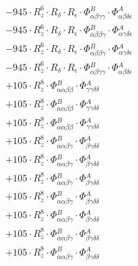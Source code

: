 \documentclass{article}
\begin{document}
\begin{subequations}
\begin{gather}
\begin{array}{c}
 \\[0.2em] 		 - 945 \cdot R_{z}^{6} \cdot R_{\delta{}} \cdot R_{\epsilon{}} \cdot \Phi{}^{B}_{\alpha{}\beta{}\gamma{}\gamma{}} \cdot \Phi{}^{A}_{\alpha{}\beta{}\delta{}\epsilon{}} 
 \\[0.2em] 		 - 945 \cdot R_{z}^{6} \cdot R_{\delta{}} \cdot R_{\epsilon{}} \cdot \Phi{}^{B}_{\alpha{}\beta{}\beta{}\gamma{}} \cdot \Phi{}^{A}_{\alpha{}\gamma{}\delta{}\epsilon{}} 
 \\[0.2em] 		 - 945 \cdot R_{z}^{6} \cdot R_{\delta{}} \cdot R_{\epsilon{}} \cdot \Phi{}^{B}_{\alpha{}\beta{}\beta{}\gamma{}} \cdot \Phi{}^{A}_{\alpha{}\gamma{}\delta{}\epsilon{}} 
 \\[0.2em] 		 - 945 \cdot R_{z}^{6} \cdot R_{\delta{}} \cdot R_{\epsilon{}} \cdot \Phi{}^{B}_{\alpha{}\beta{}\gamma{}\gamma{}} \cdot \Phi{}^{A}_{\alpha{}\beta{}\delta{}\epsilon{}} 
 \\[0.2em] 		 + 105 \cdot R_{z}^{8} \cdot \Phi{}^{B}_{\alpha{}\alpha{}\beta{}\beta{}} \cdot \Phi{}^{A}_{\gamma{}\gamma{}\delta{}\delta{}} 
 \\[0.2em] 		 + 105 \cdot R_{z}^{8} \cdot \Phi{}^{B}_{\alpha{}\alpha{}\beta{}\beta{}} \cdot \Phi{}^{A}_{\gamma{}\gamma{}\delta{}\delta{}} 
 \\[0.2em] 		 + 105 \cdot R_{z}^{8} \cdot \Phi{}^{B}_{\alpha{}\alpha{}\beta{}\beta{}} \cdot \Phi{}^{A}_{\gamma{}\gamma{}\delta{}\delta{}} 
 \\[0.2em] 		 + 105 \cdot R_{z}^{8} \cdot \Phi{}^{B}_{\alpha{}\alpha{}\beta{}\gamma{}} \cdot \Phi{}^{A}_{\beta{}\gamma{}\delta{}\delta{}} 
 \\[0.2em] 		 + 105 \cdot R_{z}^{8} \cdot \Phi{}^{B}_{\alpha{}\alpha{}\beta{}\gamma{}} \cdot \Phi{}^{A}_{\beta{}\gamma{}\delta{}\delta{}} 
 \\[0.2em] 		 + 105 \cdot R_{z}^{8} \cdot \Phi{}^{B}_{\alpha{}\alpha{}\beta{}\gamma{}} \cdot \Phi{}^{A}_{\beta{}\gamma{}\delta{}\delta{}} 
 \\[0.2em] 		 + 105 \cdot R_{z}^{8} \cdot \Phi{}^{B}_{\alpha{}\alpha{}\beta{}\gamma{}} \cdot \Phi{}^{A}_{\beta{}\gamma{}\delta{}\delta{}} 
 \\[0.2em] 		 + 105 \cdot R_{z}^{8} \cdot \Phi{}^{B}_{\alpha{}\alpha{}\beta{}\gamma{}} \cdot \Phi{}^{A}_{\beta{}\gamma{}\delta{}\delta{}} 
 \\[0.2em] 		 + 105 \cdot R_{z}^{8} \cdot \Phi{}^{B}_{\alpha{}\alpha{}\beta{}\gamma{}} \cdot \Phi{}^{A}_{\beta{}\gamma{}\delta{}\delta{}} 
 \\[0.2em] 		 + 105 \cdot R_{z}^{8} \cdot \Phi{}^{B}_{\alpha{}\alpha{}\beta{}\gamma{}} \cdot \Phi{}^{A}_{\beta{}\gamma{}\delta{}\delta{}} 

\end{array}
\end{gather}
\end{subequations}
\end{document}
